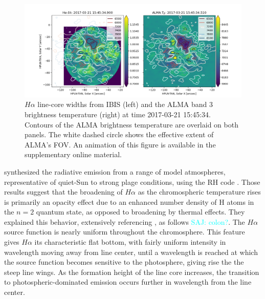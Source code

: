 \documentclass[twocolumn]{aastex62}
\newcommand{\halpha}{\ensuremath{H\alpha}}
\newcommand{\saj}[1]{\textcolor{cyan}{SAJ: #1}}
\begin{document}
\begin{figure}
    \centering
    \includegraphics[width=\linewidth]{figures/IBIS_wdth_ALMA_tb_0100.png}
    \caption{\halpha{} line-core widths from IBIS (left) and the ALMA band 3 brightness temperature (right) at time 2017-03-21 15:45:34.  Contours of the ALMA brightness temperature are overlaid on both panels.  The white dashed circle shows the effective extent of ALMA's FOV.  An animation of this figure is available in the supplementary online material.}
    \label{fig:almaibis}
\end{figure}

\citet{2019Molnar} synthesized the radiative emission from a range of model atmospheres, representative of quiet-Sun to strong plage conditions, using the RH code \citep{2001Uitenbroek}.  Those results suggest that the broadening of \halpha{} as the chromospheric temperature rises is primarily an opacity effect due to an enhanced number density of H atoms in the $n=2$ quantum state, as opposed to broadening by thermal effects.  They explained this behavior, extensively referencing \citet{2012Leenaarts}, as follows \saj{colon?}.  The \halpha{} source function is nearly uniform throughout the chromosphere.  This feature gives \halpha{} its characteristic flat bottom, with fairly uniform intensity in wavelength moving away from line center, until a wavelength is reached at which the source function becomes sensitive to the photosphere, giving rise the the steep line wings.  As the formation height of the line core increases, the transition to photospheric-dominated emission occurs further in wavelength from the line center.  
\end{document}
